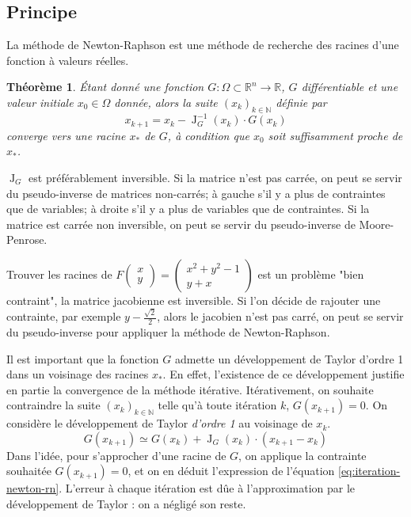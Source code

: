 \documentclass[3p, twocolumn]{elsarticle}
\DeclareMathOperator{\Jacobian}{J}
\newtheorem{thm}{Théorème}
\begin{document}
\subsection{Principe}
La méthode de Newton-Raphson est une méthode de recherche des racines d'une fonction à valeurs réelles.
\begin{thm}
    \'Etant donné une fonction $G: \Omega\subset\mathbb{R}^n\longrightarrow \mathbb{R}$, $G$ différentiable et une valeur initiale $x_0\in \Omega$ donnée, alors la suite $(x_k)_{k\in \mathbb{N}}$ définie par
    \begin{equation}
        x_{k+1} = x_k - \Jacobian^{-1}_G(x_k)\cdot G(x_k)
        \label{eq:iteration-newton-rn}
    \end{equation}
    converge vers une racine $x_*$ de $G$, à condition que $x_0$ soit suffisamment proche de $x_*$.
\end{thm}
\begin{rmk}
    $\Jacobian_G$ est préférablement inversible. Si la matrice n'est pas carrée, on peut se servir du pseudo-inverse de matrices non-carrés; à gauche s'il y a plus de contraintes que de variables; à droite s'il y a plus de variables que de contraintes. Si la matrice est carrée non inversible, on peut se servir du pseudo-inverse de Moore-Penrose.
    \begin{exemple}
        Trouver les racines de $F
            \begin{pmatrix}
                x \\y
            \end{pmatrix}
            =
            \begin{pmatrix}
                x^2+y^2-1 \\
                y+x
            \end{pmatrix}$ est un problème "bien contraint", la matrice jacobienne est inversible. Si l'on décide de rajouter une contrainte, par exemple $y-\frac{\sqrt2}{2}$, alors le jacobien n'est pas carré, on peut se servir du pseudo-inverse pour appliquer la méthode de Newton-Raphson.
    \end{exemple}
\end{rmk}
\begin{rmk}
    Il est important que la fonction $G$ admette un développement de Taylor d'ordre 1 dans un voisinage des racines $x_*$. En effet, l'existence de ce développement justifie en partie la convergence de la méthode itérative. Itérativement, on souhaite contraindre la suite $(x_k)_{k\in \mathbb{N}}$ telle qu'à toute itération $k$, $G(x_{k+1})=0$. On considère le développement de Taylor \textit{d'ordre 1} au voisinage de $x_{k}$.
    \begin{equation*}
        G(x_{k+1})\simeq G(x_k)+\Jacobian_G(x_k)\cdot(x_{k+1}-x_k)
    \end{equation*}
    Dans l'idée, pour s'approcher d'une racine de $G$, on applique la contrainte souhaitée $G(x_{k+1})=0$, et on en déduit l'expression de l'équation \ref{eq:iteration-newton-rn}. L'erreur à chaque itération est dûe à l'approximation par le développement de Taylor : on a négligé son reste.
\end{rmk}
\end{document}
